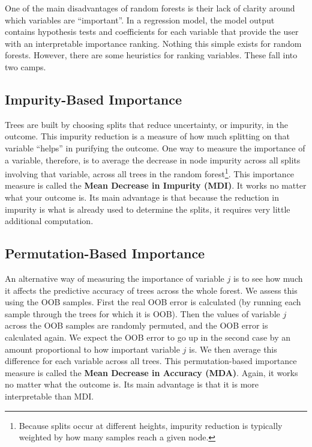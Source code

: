 One of the main disadvantages of random forests is their lack of clarity around which variables are ``important''. In a regression model, the model output contains hypothesis tests and coefficients for each variable that provide the user with an interpretable importance ranking. Nothing this simple exists for random forests. However, there are some heuristics for ranking variables. These fall into two camps. 

\subsection{Impurity-Based Importance}

Trees are built by choosing splits that reduce uncertainty, or impurity, in the outcome. This impurity reduction is a measure of how much splitting on that variable ``helps'' in purifying the outcome. One way to measure the importance of a variable, therefore, is to average the decrease in node impurity across all splits involving that variable, across all trees in the random forest\footnote{Because splits occur at different heights, impurity reduction is typically weighted by how many samples reach a given node.}. This importance measure is called the \textbf{Mean Decrease in Impurity (MDI)}. It works no matter what your outcome is. Its main advantage is that because the reduction in impurity is what is already used to determine the splits, it requires very little additional computation.  

\subsection{Permutation-Based Importance}

An alternative way of measuring the importance of variable $j$ is to see how much it affects the predictive accuracy of trees across the whole forest. We assess this using the OOB samples. First the real OOB error is calculated (by running each sample through the trees for which it is OOB). Then the values of variable $j$ across the OOB samples are randomly permuted, and the OOB error is calculated again. We expect the OOB error to go up in the second case by an amount proportional to how important variable $j$ is. We then average this difference for each variable across all trees. This permutation-based importance measure is called the \textbf{Mean Decrease in Accuracy (MDA)}. Again, it works no matter what the outcome is. Its main advantage is that it is more interpretable than MDI. 

